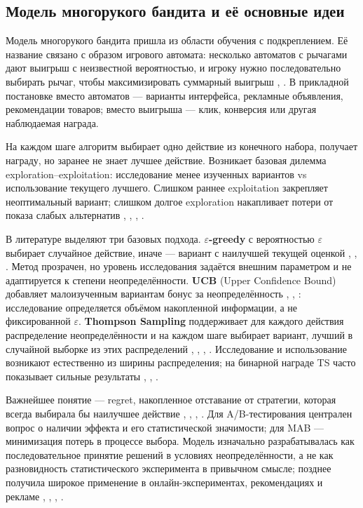 \subsection{Модель многорукого бандита и её основные идеи}\label{ux43cux43eux434ux435ux43bux44c-ux43cux43dux43eux433ux43eux440ux443ux43aux43eux433ux43e-ux431ux430ux43dux434ux438ux442ux430-ux438-ux435ux451-ux43eux441ux43dux43eux432ux43dux44bux435-ux438ux434ux435ux438}

Модель многорукого бандита пришла из области обучения с подкреплением. Её название связано с образом игрового автомата: несколько автоматов с рычагами дают выигрыш с неизвестной вероятностью, и игроку нужно последовательно выбирать рычаг, чтобы максимизировать суммарный выигрыш \cite{ref1}, \cite{ref2}. В прикладной постановке вместо автоматов --- варианты интерфейса, рекламные объявления, рекомендации товаров; вместо выигрыша --- клик, конверсия или другая наблюдаемая награда.

На каждом шаге алгоритм выбирает одно действие из конечного набора, получает награду, но заранее не знает лучшее действие. Возникает базовая дилемма exploration--exploitation: исследование менее изученных вариантов vs использование текущего лучшего. Слишком раннее exploitation закрепляет неоптимальный вариант; слишком долгое exploration накапливает потери от показа слабых альтернатив \cite{ref2}, \cite{ref14}, \cite{ref16}, \cite{ref17}.

В литературе выделяют три базовых подхода. \textbf{$\varepsilon$-greedy} с вероятностью $\varepsilon$ выбирает случайное действие, иначе --- вариант с наилучшей текущей оценкой \cite{ref13}, \cite{ref16}, \cite{ref17}. Метод прозрачен, но уровень исследования задаётся внешним параметром и не адаптируется к степени неопределённости. \textbf{UCB} (Upper Confidence Bound) добавляет малоизученным вариантам бонус за неопределённость \cite{ref4}, \cite{ref14}, \cite{ref17}: исследование определяется объёмом накопленной информации, а не фиксированной $\varepsilon$. \textbf{Thompson Sampling} поддерживает для каждого действия распределение неопределённости и на каждом шаге выбирает вариант, лучший в случайной выборке из этих распределений \cite{ref1}, \cite{ref8}, \cite{ref9}, \cite{ref16}. Исследование и использование возникают естественно из ширины распределения; на бинарной награде TS часто показывает сильные результаты \cite{ref8}, \cite{ref9}, \cite{ref16}.

Важнейшее понятие --- regret, накопленное отставание от стратегии, которая всегда выбирала бы наилучшее действие \cite{ref3}, \cite{ref14}, \cite{ref16}, \cite{ref17}. Для A/B-тестирования централен вопрос о наличии эффекта и его статистической значимости; для MAB --- минимизация потерь в процессе выбора. Модель изначально разрабатывалась как последовательное принятие решений в условиях неопределённости, а не как разновидность статистического эксперимента в привычном смысле; позднее получила широкое применение в онлайн-экспериментах, рекомендациях и рекламе \cite{ref2}, \cite{ref12}, \cite{ref13}, \cite{ref16}.

